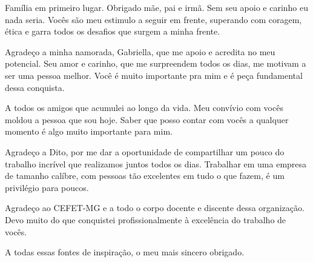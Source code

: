 
\begin{agradecimentos}

Família em primeiro lugar. Obrigado mãe, pai e irmã. Sem seu apoio e carinho eu nada seria. Vocês são meu estimulo a seguir em frente, superando com coragem, ética e garra todos os desafios que surgem a minha frente.

Agradeço a minha namorada, Gabriella, que me apoio e acredita no meu potencial. Seu amor e carinho, que me surpreendem todos os dias, me motivam a ser uma pessoa melhor. Você é muito importante pra mim e é peça fundamental dessa conquista.

A todos os amigos que acumulei ao longo da vida. Meu convívio com vocês moldou a pessoa que sou hoje. Saber que posso contar com vocês a qualquer momento é algo muito importante para mim.

Agradeço a Dito, por me dar a oportunidade de compartilhar um pouco do trabalho incrível que realizamos juntos todos os dias. Trabalhar em uma empresa de tamanho calíbre, com pessoas tão excelentes em tudo o que fazem, é um privilégio para poucos.

Agradeço ao CEFET-MG e a todo o corpo docente e discente dessa organização. Devo muito do que conquistei profissionalmente à excelência do trabalho de vocês.

A todas essas fontes de inspiração, o meu mais sincero obrigado.

\end{agradecimentos}
